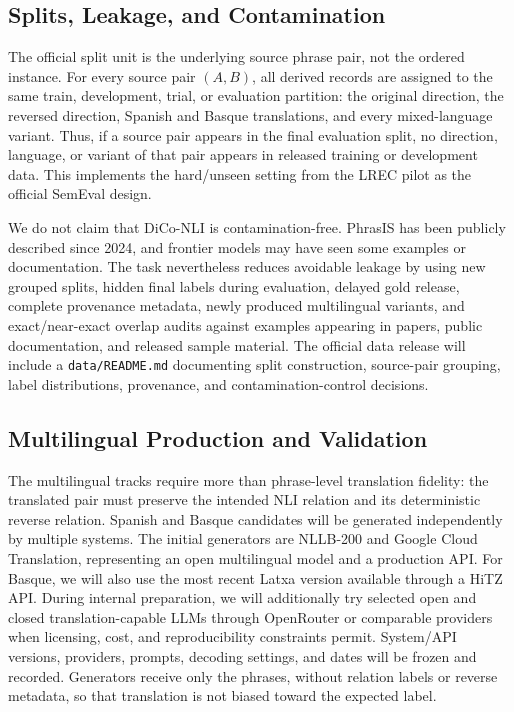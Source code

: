 \documentclass[11pt]{article}
\begin{document}
\subsection{Splits, Leakage, and Contamination}

The official split unit is the underlying source phrase pair, not the ordered instance.
For every source pair $(A,B)$, all derived records are assigned to the same train, development, trial, or evaluation partition: the original direction, the reversed direction, Spanish and Basque translations, and every mixed-language variant.
Thus, if a source pair appears in the final evaluation split, no direction, language, or variant of that pair appears in released training or development data.
This implements the hard/unseen setting from the LREC pilot as the official SemEval design.

We do not claim that DiCo-NLI is contamination-free.
PhrasIS has been publicly described since 2024, and frontier models may have seen some examples or documentation.
The task nevertheless reduces avoidable leakage by using new grouped splits, hidden final labels during evaluation, delayed gold release, complete provenance metadata, newly produced multilingual variants, and exact/near-exact overlap audits against examples appearing in papers, public documentation, and released sample material.
The official data release will include a \texttt{data/README.md} documenting split construction, source-pair grouping, label distributions, provenance, and contamination-control decisions.

\subsection{Multilingual Production and Validation}

The multilingual tracks require more than phrase-level translation fidelity: the translated pair must preserve the intended NLI relation and its deterministic reverse relation.
Spanish and Basque candidates will be generated independently by multiple systems.
The initial generators are NLLB-200 and Google Cloud Translation, representing an open multilingual model and a production API.
For Basque, we will also use the most recent Latxa version available through a HiTZ API.
During internal preparation, we will additionally try selected open and closed translation-capable LLMs through OpenRouter or comparable providers when licensing, cost, and reproducibility constraints permit.
System/API versions, providers, prompts, decoding settings, and dates will be frozen and recorded.
Generators receive only the phrases, without relation labels or reverse metadata, so that translation is not biased toward the expected label.
\end{document}
